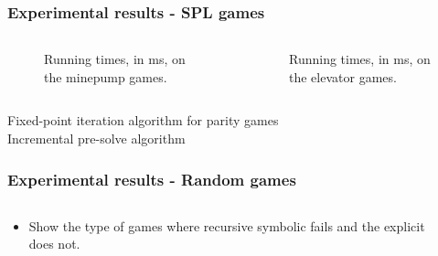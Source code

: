 \documentclass[aspectratio=169]{beamer}
\begin{document}
\begin{frame}[t]
\frametitle{Experimental results - SPL games}
\def\scalegraphs{0.6}
\begin{columns}[t]
	\begin{column}{0.5\textwidth}
		\begin{figure}[H]
			
			\caption{Running times, in ms, on the minepump games.}
			\label{fig:results_minepump}
		\end{figure}%
	\end{column}
	\begin{column}{0.5\textwidth}
		\begin{figure}[H]
			
			\caption{Running times, in ms, on the elevator games.}
			\label{fig:results_elevator}
		\end{figure}%
	\end{column}
\end{columns}
\small
{} Fixed-point iteration algorithm for parity games\\
 Incremental pre-solve algorithm\\
\end{frame}


\begin{frame}[t]
\frametitle{Experimental results - Random games}
\begin{columns}[t]
	\begin{column}{0.5\textwidth}
		\begin{itemize}
			\item Show the type of games where recursive symbolic fails and the explicit does not.
		\end{itemize}
	\end{column}
	\begin{column}{0.5\textwidth}
	\end{column}
\end{columns}
\end{frame}
\end{document}
